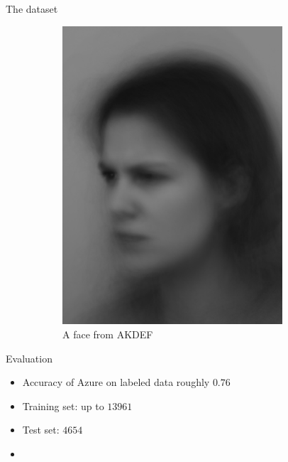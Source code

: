 \documentclass[10pt]{beamer}
\begin{document}
\begin{frame}[fragile]{The dataset}
\begin{figure}[h!]
\begin{subfigure}[c]{0.45\textwidth}
            \includegraphics[width=0.9\textwidth]{exercise_3/paper/images/FANHL.JPG}
            \caption{A face from AKDEF}
            \label{fig:AKDEF_face}
        \end{subfigure}
        \caption{}
        \label{fig:faces}
    \end{figure}
\end{frame}
\begin{frame}[fragile]{Evaluation}
\begin{itemize}
    \item Accuracy of Azure on labeled data roughly $0.76$
    \item Training set: up to $13961$
    \item Test set: $4654$
    \item 
\end{itemize}
\end{frame}
\end{document}
